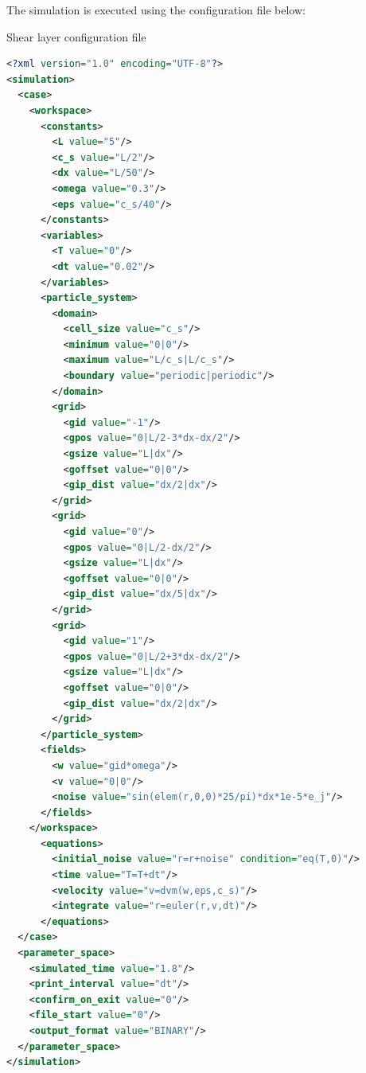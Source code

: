 \documentclass[a4paper,12pt,openany]{book}
\theoremstyle{break}
\begin{document}
The simulation is executed using the configuration file below:
\begin{samepage}
\begin{example}{Shear layer configuration file}{}
\lstset{basicstyle=\tiny}
\begin{lstlisting}[language=XML]
<?xml version="1.0" encoding="UTF-8"?>
<simulation>
  <case>
    <workspace>
      <constants>
        <L value="5"/>
        <c_s value="L/2"/>
        <dx value="L/50"/>
        <omega value="0.3"/>
        <eps value="c_s/40"/>
      </constants>
      <variables>
        <T value="0"/>
        <dt value="0.02"/>
      </variables>
      <particle_system>
        <domain>
          <cell_size value="c_s"/>
          <minimum value="0|0"/>
          <maximum value="L/c_s|L/c_s"/>
          <boundary value="periodic|periodic"/>
        </domain>
        <grid>
          <gid value="-1"/>
          <gpos value="0|L/2-3*dx-dx/2"/>
          <gsize value="L|dx"/>
          <goffset value="0|0"/>
          <gip_dist value="dx/2|dx"/>
        </grid>
        <grid>
          <gid value="0"/>
          <gpos value="0|L/2-dx/2"/>
          <gsize value="L|dx"/>
          <goffset value="0|0"/>
          <gip_dist value="dx/5|dx"/>
        </grid>
        <grid>
          <gid value="1"/>
          <gpos value="0|L/2+3*dx-dx/2"/>
          <gsize value="L|dx"/>
          <goffset value="0|0"/>
          <gip_dist value="dx/2|dx"/>
        </grid>
      </particle_system>
      <fields>
        <w value="gid*omega"/>
        <v value="0|0"/>
        <noise value="sin(elem(r,0,0)*25/pi)*dx*1e-5*e_j"/>
      </fields>
    </workspace>
      <equations>
        <initial_noise value="r=r+noise" condition="eq(T,0)"/>
        <time value="T=T+dt"/>
        <velocity value="v=dvm(w,eps,c_s)"/>
        <integrate value="r=euler(r,v,dt)"/>
      </equations>
  </case>
  <parameter_space>
    <simulated_time value="1.8"/>
    <print_interval value="dt"/>
    <confirm_on_exit value="0"/>
    <file_start value="0"/>
    <output_format value="BINARY"/>
  </parameter_space>
</simulation>
\end{lstlisting}
\end{example}
\end{samepage}
\end{document}
